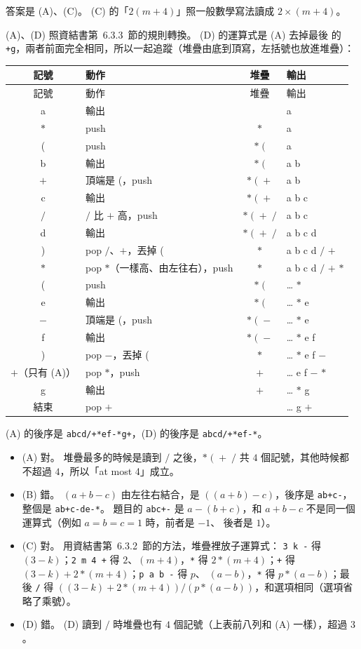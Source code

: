 \begin{pastsoln}
答案是 (A)、(C)。 (C) 的「$2(m+4)$」照一般數學寫法讀成 $2 \times (m + 4)$。

(A)、(D) 照資結書第~6.3.3~節的規則轉換。 (D) 的運算式是 (A) 去掉最後
的 \texttt{+g}，兩者前面完全相同，所以一起追蹤（堆疊由底到頂寫，左括號也放進堆疊）：
{\small
\begin{longtable}{clcl}
\toprule
記號 & 動作 & 堆疊 & 輸出 \\
\midrule
\endfirsthead
\toprule
記號 & 動作 & 堆疊 & 輸出 \\
\midrule
\endhead
a & 輸出 & & a \\
$*$ & push & $*$ & a \\
( & push & $*\;($ & a \\
b & 輸出 & $*\;($ & a b \\
$+$ & 頂端是 (，push & $*\;(\;+$ & a b \\
c & 輸出 & $*\;(\;+$ & a b c \\
$/$ & $/$ 比 $+$ 高，push & $*\;(\;+\;/$ & a b c \\
d & 輸出 & $*\;(\;+\;/$ & a b c d \\
) & pop $/$、$+$，丟掉 ( & $*$ & a b c d $/$ $+$ \\
$*$ & pop $*$（一樣高、由左往右），push & $*$ & a b c d $/$ $+$ $*$ \\
( & push & $*\;($ & \ldots{} $*$ \\
e & 輸出 & $*\;($ & \ldots{} $*$ e \\
$-$ & 頂端是 (，push & $*\;(\;-$ & \ldots{} $*$ e \\
f & 輸出 & $*\;(\;-$ & \ldots{} $*$ e f \\
) & pop $-$，丟掉 ( & $*$ & \ldots{} $*$ e f $-$ \\
\midrule
$+$（只有 (A)）& pop $*$，push & $+$ & \ldots{} e f $-$ $*$ \\
g & 輸出 & $+$ & \ldots{} $*$ g \\
結束 & pop $+$ & & \ldots{} g $+$ \\
\bottomrule
\end{longtable}}
(A) 的後序是 \texttt{abcd/+*ef-*g+}，(D) 的後序是 \texttt{abcd/+*ef-*}。

\begin{itemize}
\item (A) 對。 堆疊最多的時候是讀到 $/$ 之後，$*\;(\;+\;/$ 共 $4$ 個記號，其他時候都
不超過 $4$，所以「at most 4」成立。
\item (B) 錯。 $(a + b - c)$ 由左往右結合，是 $((a + b) - c)$，後序是
\texttt{ab+c-}，整個是 \texttt{ab+c-de-*}。 題目的 \texttt{abc+-} 是
$a - (b + c)$，和 $a + b - c$ 不是同一個運算式（例如 $a = b = c = 1$ 時，前者是 $-1$、
後者是 $1$）。
\item (C) 對。 用資結書第~6.3.2~節的方法，堆疊裡放子運算式：
\texttt{3 k -} 得 $(3 - k)$；\texttt{2 m 4 +} 得 $2$、$(m + 4)$，\texttt{*} 得
$2 * (m + 4)$；\texttt{+} 得 $(3 - k) + 2 * (m + 4)$；\texttt{p a b -} 得 $p$、
$(a - b)$，\texttt{*} 得 $p * (a - b)$；最後 \texttt{/} 得
$((3 - k) + 2 * (m + 4)) / (p * (a - b))$，和選項相同（選項省略了乘號）。
\item (D) 錯。 (D) 讀到 $/$ 時堆疊也有 $4$ 個記號（上表前八列和 (A) 一樣），超過 $3$。
\end{itemize}


\end{pastsoln}
